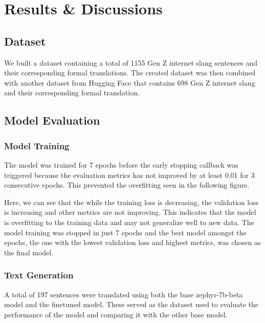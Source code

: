 \chapter{Results \& Discussions}
\section{Dataset}
We built a dataset containing a total of 1155 Gen Z internet slang sentences and their corresponding formal translations. The created dataset was then combined with another dataset from Hugging Face that contains 698 Gen Z internet slang and their corresponding formal translation.
 
\section{Model Evaluation}
\subsection{Model Training}
The model was trained for 7 epochs before the early stopping callback was triggered because the evaluation metrics has not improved by at least 0.01 for 3 consecutive epochs. This prevented the overfitting seen in the following figure. 

Here, we can see that the while the training loss is decreasing, the validation loss is increasing and other metrics are not improving. This indicates that the model is overfitting to the training data and may not generalize well to new data. The model training was stopped in just 7 epochs and the best model amongst the epochs, the one with the lowest validation loss and highest metrics, was chosen as the final model.

\subsection{Text Generation}
A total of 197 sentences were translated using both the base zephyr-7b-beta model and the finetuned model. These served as the dataset used to evaluate the performance of the model and comparing it with the other base model.

